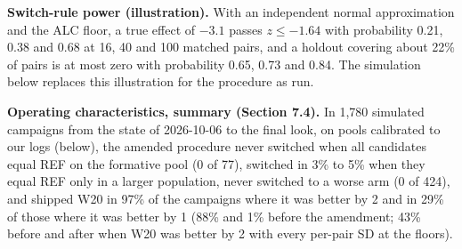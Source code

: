 \documentclass[
]{article}
\begin{document}
\textbf{Switch-rule power (illustration).} With an independent normal
approximation and the ALC floor, a true effect of \(-3.1\) passes
\(z \le -1.64\) with probability 0.21, 0.38 and 0.68 at 16, 40 and 100
matched pairs, and a holdout covering about 22\% of pairs is at most
zero with probability 0.65, 0.73 and 0.84. The simulation below replaces
this illustration for the procedure as run.

\textbf{Operating characteristics, summary (Section 7.4).} In 1,780
simulated campaigns from the state of 2026-10-06 to the final look, on
pools calibrated to our logs (below), the amended procedure never
switched when all candidates equal REF on the formative pool (0 of 77),
switched in 3\% to 5\% when they equal REF only in a larger population,
never switched to a worse arm (0 of 424), and shipped W20 in 97\% of the
campaigns where it was better by 2 and in 29\% of those where it was
better by 1 (88\% and 1\% before the amendment; 43\% before and after
when W20 was better by 2 with every per-pair SD at the floors).
\end{document}
